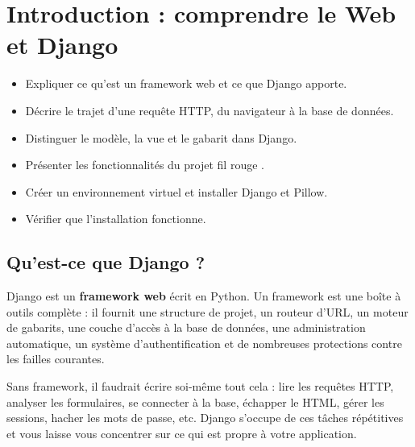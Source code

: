 \chapter{Introduction : comprendre le Web et Django}
\label{ch:introduction}


\begin{objectifs}
\begin{itemize}
  \item Expliquer ce qu'est un framework web et ce que Django apporte.
  \item Décrire le trajet d'une requête HTTP, du navigateur à la base de données.
  \item Distinguer le modèle, la vue et le gabarit dans Django.
  \item Présenter les fonctionnalités du projet fil rouge \gesibiblio.
  \item Créer un environnement virtuel et installer Django et Pillow.
  \item Vérifier que l'installation fonctionne.
\end{itemize}
\end{objectifs}

\section{Qu'est-ce que Django ?}

Django est un \textbf{framework web} écrit en Python. Un framework est une boîte à
outils complète : il fournit une structure de projet, un routeur d'URL, un moteur de
gabarits, une couche d'accès à la base de données, une administration automatique,
un système d'authentification et de nombreuses protections contre les failles
courantes.

Sans framework, il faudrait écrire soi-même tout cela : lire les requêtes HTTP,
analyser les formulaires, se connecter à la base, échapper le HTML, gérer les
sessions, hacher les mots de passe, etc. Django s'occupe de ces tâches répétitives
et vous laisse vous concentrer sur ce qui est propre à votre application.

